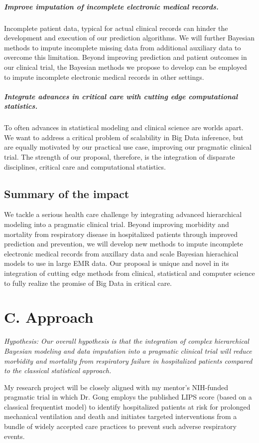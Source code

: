 \documentclass[11pt,notitlepage]{article}
\begin{document}
\subparagraph*{Improve imputation of incomplete electronic medical records.}
Incomplete patient data, typical for actual clinical records can hinder the development and execution of our prediction algorithms. We will further Bayesian methods to impute incomplete missing data from additional auxiliary data to overcome this limitation. Beyond improving prediction and patient outcomes in our clinical trial, the Bayesian methods we propose to develop can be employed to impute incomplete electronic medical records in other settings.

\subparagraph*{Integrate advances in critical care with cutting edge computational statistics.}
To often advances in statistical modeling and clinical science are worlds apart. We want to address a critical problem of scalability in Big Data inference, but are equally motivated by our practical use case, improving our pragmatic clinical trial. The strength of our proposal, therefore, is the integration of disparate disciplines, critical care and computational statistics. 

\subsection*{Summary of the impact}
We tackle a serious health care challenge by integrating advanced hierarchical modeling into a pragmatic clinical trial. Beyond improving morbidity and mortality from respiratory disease in hospitalized patients through improved prediction and prevention, we will develop new methods to impute incomplete electronic medical records from auxillary data and scale Bayesian hierachical models to use in large EMR data. Our proposal is unique and novel in its integration of cutting edge methods from clinical, statistical and computer science to fully realize the promise of Big Data in critical care.

\section*{C. Approach}
\begin{flushleft}
\textit{Hypothesis: Our overall hypothesis is that the integration of complex hierarchical Bayesian modeling and data imputation into a pragmatic clinical trial will reduce morbidity and mortality from respiratory failure in hospitalized patients compared to the classical statistical approach.}
\end{flushleft} 

My research project will be closely aligned with my mentor's NIH-funded pragmatic trial in which Dr. Gong employs the published LIPS score \cite{Herridge_12594312} (based on a classical frequentist model) to identify hospitalized patients at risk for prolonged mechanical ventilation and death and initiates targeted interventions from a bundle of widely accepted care practices to prevent such adverse respiratory events.
\end{document}
